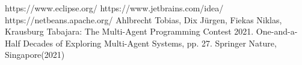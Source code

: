 
\begin{thebibliography}{8}
	 https://www.eclipse.org/
	 https://www.jetbrains.com/idea/
	 https://netbeans.apache.org/
	 Ahlbrecht Tobias, Dix Jürgen, Fiekas Niklas, Krausburg Tabajara: The Multi-Agent Programming Contest 2021. One-and-a-Half Decades of Exploring Multi-Agent Systems, pp. 27. Springer Nature, Singapore(2021)
	
	
\end{thebibliography}
